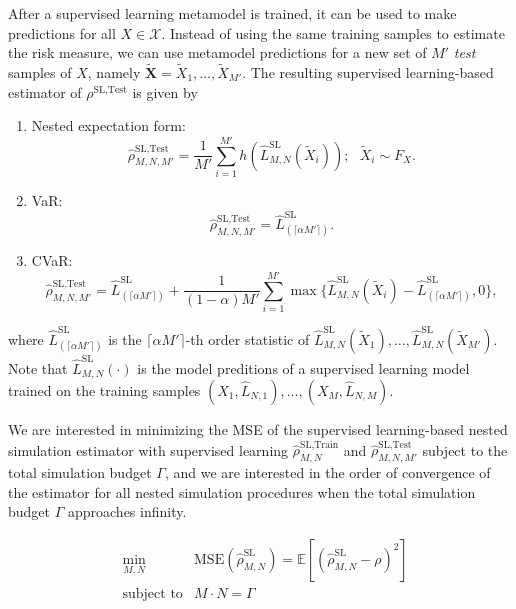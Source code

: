 After a supervised learning metamodel is trained, it can be used to make predictions for all $X \in \mathcal{X}$.
Instead of using the same training samples to estimate the risk measure, we can use metamodel predictions for a new set of $M'$ \textit{test} samples of $X$, namely $\tilde{\mathbf{X}} = \tilde{X}_1, \dots, \tilde{X}_{M'}$.
The resulting supervised learning-based estimator of $\rho^{\text{SL}, \text{Test}}$ is given by

\begin{enumerate}
    \item   Nested expectation form:
            \begin{equation} \label{eq1:sl-test}
            \hat{\rho}^{\text{SL}, \text{Test}}_{M, N, M'} = \frac{1}{M'} \sum_{i=1}^{M'} h(\hat{L}^{\text{SL}}_{M, N}(\tilde{X}_i)); ~~~ \tilde{X}_i \sim F_X.
            \end{equation}
    \item   VaR:
            $$\hat{\rho}^{\text{SL}, \text{Test}}_{M, N, M'} = \hat{L}^{\text{SL}}_{(\lceil \alpha M' \rceil)}.$$
    \item   CVaR:
            \begin{equation*}
                \hat{\rho}^{\text{SL}, \text{Test}}_{M, N, M'} 
                = \hat{L}^{\text{SL}}_{(\lceil \alpha M' \rceil)} 
                + \frac{1}{(1-\alpha) M'} \sum_{i=1}^{M'} \max \{\hat{L}^{\text{SL}}_{M, N}(\tilde{X}_i) - \hat{L}^{\text{SL}}_{(\lceil \alpha M' \rceil)}, 0 \}, 
            \end{equation*}
\end{enumerate}
where $\hat{L}^{\text{SL}}_{(\lceil \alpha M' \rceil)}$ is the $\lceil \alpha M' \rceil$-th order statistic of $\hat{L}^{\text{SL}}_{M, N}(\tilde{X}_1), \dots, \hat{L}^{\text{SL}}_{M, N}(\tilde{X}_{M'})$. 
Note that $\hat{L}^{\text{SL}}_{M, N}(\cdot)$ is the model preditions of a supervised learning model trained on the training samples $(X_1, \hat{L}_{N, 1}), \dots, (X_M, \hat{L}_{N, M})$.

We are interested in minimizing the MSE of the supervised learning-based nested simulation estimator with supervised learning $\hat{\rho}^{\text{SL}, \text{Train}}_{M, N}$ and $\hat{\rho}^{\text{SL}, \text{Test}}_{M, N, M'}$ subject to the total simulation budget $\Gamma$, and we are interested in the order of convergence of the estimator for all nested simulation procedures when the total simulation budget $\Gamma$ approaches infinity.

\begin{align}
    & \min_{M, N}  & \text{MSE}(\hat{\rho}^{\text{SL}}_{M, N}) = \mathbb{E} \left[ \left( \hat{\rho}^{\text{SL}}_{M, N} - \rho \right)^2 \right] \nonumber \\
    & \text{subject to} & M \cdot N = \Gamma 
\end{align}

